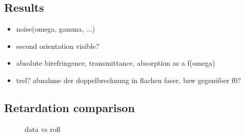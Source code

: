 \subsection{Results}
% 
\begin{itemize}
\item noise(omega, gamma, ...)
\item second orientation visible?
\item absolute birefringence, transmittance, absorption as a f(omega)
\item trel? abnahme der doppelbrechnung in flachen faser, bzw gegenüber f0?
\end{itemize}
% 
% 
% 
\subsection{Retardation comparison}
% 
\begin{figure}[!t]
\centering
{}
\caption[data vs rofl]{data vs rofl}
\label{fig:dataVsRofl}
\end{figure}
% 
% 
% 
% 
